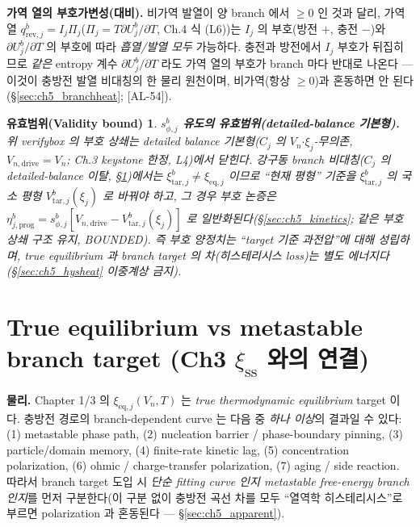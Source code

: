 \documentclass[11pt,a4paper]{article}
\newtheorem*{boundbox}{유효범위(Validity bound)}
\newcommand{\eq}{\mathrm{eq}}
\newcommand{\drive}{\mathrm{drive}}
\newcommand{\rev}{\mathrm{rev}}
\newcommand{\prog}{\mathrm{prog}}
\newcommand{\tar}{\mathrm{tar}}
\newcommand{\sstat}{\mathrm{ss}}
\newcommand{\AL}[1]{\textsf{[AL-#1]}}
\begin{document}
\textbf{가역 열의 부호가변성(대비).} 비가역 발열이 양 branch 에서 $\ge0$ 인 것과 달리, 가역 열
$q_{\rev,j}^b=I_j\Pi_j$($\Pi_j=T\partial U_j^b/\partial T$, Ch.4 식 (L6))는 $I_j$ 의 부호(방전 $+$, 충전 $-$)와
$\partial U_j^b/\partial T$ 의 부호에 따라 \emph{흡열/발열 모두} 가능하다. 충전과 방전에서 $I_j$ 부호가
뒤집히므로 \emph{같은} entropy 계수 $\partial U_j^b/\partial T$ 라도 가역 열의 부호가 branch 마다 반대로 나온다
— 이것이 충방전 발열 비대칭의 한 물리 원천이며, 비가역(항상 $\ge0$)과 혼동하면 안 된다(\S\ref{sec:ch5_branchheat};
\AL{54}).

\begin{boundbox}
\textbf{$s_{\phi,j}^b$ 유도의 유효범위(detailed-balance 기본형).} 위 verifybox 의 부호 상쇄는 \emph{detailed
balance 기본형}($C_j$ 의 $V_n$$\cdot$$\xi_j$-무의존, $V_{n,\drive}=V_n$; Ch.3 keystone 한정, L4)에서 닫힌다.
강구동 branch 비대칭($C_j$ 의 detailed-balance 이탈, \S\ref{sec:ch5_branch})에서는 $\xi_{\tar,j}^b\ne\xi_{\eq,j}$
이므로 ``현재 평형'' 기준을 $\xi_{\tar,j}^b$ 의 국소 평형 $V_{\tar,j}^b(\xi_j)$ 로 바꿔야 하고, 그 경우 부호
논증은 $\eta_{j,\prog}^b=s_{\phi,j}^b[V_{n,\drive}-V_{\tar,j}^b(\xi_j)]$ 로 일반화된다(\S\ref{sec:ch5_kinetics};
같은 부호 상쇄 구조 유지, BOUNDED). 즉 부호 양정치는 ``target 기준 과전압''에 대해 성립하며, true equilibrium
과 branch target 의 차(히스테리시스 loss)는 \emph{별도} 에너지다(\S\ref{sec:ch5_hysheat} 이중계상 금지).
\end{boundbox}

\section{True equilibrium vs metastable branch target (Ch3 $\xi_{\sstat}$ 와의 연결)}\label{sec:ch5_branch}
\textbf{물리.} Chapter 1/3 의 $\xi_{\eq,j}(V_n,T)$ 는 \emph{true thermodynamic equilibrium} target 이다.
충방전 경로의 branch-dependent curve 는 다음 중 \emph{하나 이상}의 결과일 수 있다: (1) metastable phase path,
(2) nucleation barrier / phase-boundary pinning, (3) particle/domain memory, (4) finite-rate kinetic lag,
(5) concentration polarization, (6) ohmic / charge-transfer polarization, (7) aging / side reaction. 따라서
branch target 도입 시 \emph{단순 fitting curve 인지 metastable free-energy branch 인지}를 먼저 구분한다(이
구분 없이 충방전 곡선 차를 모두 ``열역학 히스테리시스''로 부르면 polarization 과 혼동된다 —
\S\ref{sec:ch5_apparent}).
\end{document}
